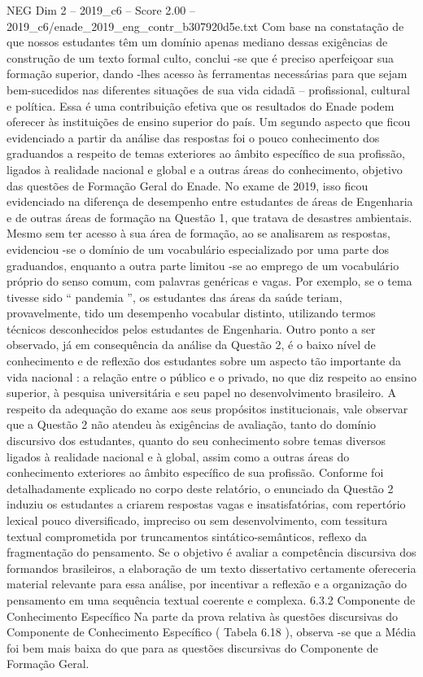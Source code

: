 \begin{textsample}{NEG Dim 2 – 2019\_c6 – Score 2.00 – 2019\_c6/enade\_2019\_eng\_contr\_b307920d5e.txt}
Com base na constatação de que nossos estudantes têm um domínio apenas mediano dessas exigências de construção de um texto formal culto, conclui -se que é preciso aperfeiçoar sua formação superior, dando -lhes acesso às ferramentas necessárias para que sejam bem-sucedidos nas diferentes situações de sua vida cidadã – profissional, cultural e política.
Essa é uma contribuição efetiva que os resultados do Enade podem oferecer às instituições de ensino superior do país.
Um segundo aspecto que ficou evidenciado a partir da análise das respostas foi o pouco conhecimento dos graduandos a respeito de temas exteriores ao âmbito específico de sua profissão, ligados à realidade nacional e global e a outras áreas do conhecimento, objetivo das questões de Formação Geral do Enade.
No exame de 2019, isso ficou evidenciado na diferença de desempenho entre estudantes de áreas de Engenharia e de outras áreas de formação na Questão 1, que tratava de desastres ambientais.
Mesmo sem ter acesso à sua área de formação, ao se analisarem as respostas, evidenciou -se o domínio de um vocabulário especializado por uma parte dos graduandos, enquanto a outra parte limitou -se ao emprego de um vocabulário próprio do senso comum, com palavras genéricas e vagas.
Por exemplo, se o tema tivesse sido “ pandemia ”, os estudantes das áreas da saúde teriam, provavelmente, tido um desempenho vocabular distinto, utilizando termos técnicos desconhecidos pelos estudantes de Engenharia.
Outro ponto a ser observado, já em consequência da análise da Questão 2, é o baixo nível de conhecimento e de reflexão dos estudantes sobre um aspecto tão importante da vida nacional : a relação entre o público e o privado, no que diz respeito ao ensino superior, à pesquisa universitária e seu papel no desenvolvimento brasileiro.
A respeito da adequação do exame aos seus propósitos institucionais, vale observar que a Questão 2 não atendeu às exigências de avaliação, tanto do domínio discursivo dos estudantes, quanto do seu conhecimento sobre temas diversos ligados à realidade nacional e à global, assim como a outras áreas do conhecimento exteriores ao âmbito específico de sua profissão.
Conforme foi detalhadamente explicado no corpo deste relatório, o enunciado da Questão 2 induziu os estudantes a criarem respostas vagas e insatisfatórias, com repertório lexical pouco diversificado, impreciso ou sem desenvolvimento, com tessitura textual comprometida por truncamentos sintático-semânticos, reflexo da fragmentação do pensamento.
Se o objetivo é avaliar a competência discursiva dos formandos brasileiros, a elaboração de um texto dissertativo certamente ofereceria material relevante para essa análise, por incentivar a reflexão e a organização do pensamento em uma sequência textual coerente e complexa. 6.3.2 Componente de Conhecimento Específico Na parte da prova relativa às questões discursivas do Componente de Conhecimento Específico ( Tabela 6.18 ), observa -se que a Média foi bem mais baixa do que para as questões discursivas do Componente de Formação Geral.

\end{textsample}
